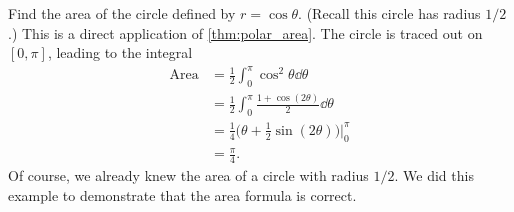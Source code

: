 \begin{example}\label{ex_polcalc3}%
Find the area of the circle defined by $r=\cos \theta$. (Recall this circle has radius $1/2$.)
\solution
This is a direct application of \autoref{thm:polar_area}. The circle is traced out on $[0,\pi]$, leading to the integral
%
%
\begin{align*}
	\text{Area} &= \frac12\int_0^\pi \cos^2\theta\dd\theta \\
	&= \frac12\int_0^\pi \frac{1+\cos(2\theta)}{2}\dd\theta\\
	&= \frac14\bigl(\theta +\frac12\sin(2\theta)\bigr)\Bigg|_0^\pi\\
	&= \frac\pi4.
\end{align*}
Of course, we already knew the area of a circle with radius $1/2$. We did this example to demonstrate that the area formula is correct.
\end{example}

